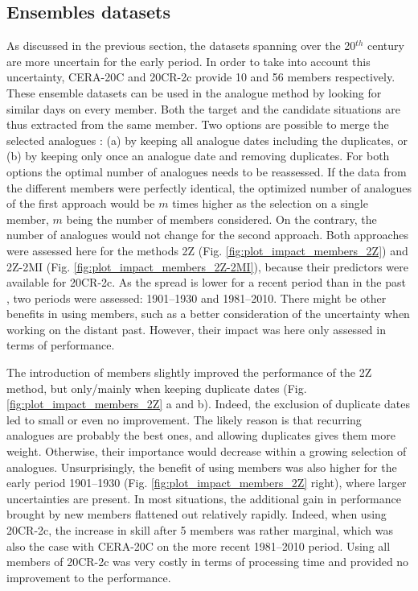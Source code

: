 \documentclass{ametsoc}
\begin{document}
\subsection{Ensembles datasets}
\label{sec:ensemble}

As discussed in the previous section, the datasets spanning over the 20$^{th}$ century are more uncertain for the early period. In order to take into account this uncertainty, CERA-20C and 20CR-2c provide 10 and 56 members respectively. These ensemble datasets can be used in the analogue method by looking for similar days on every member. Both the target and the candidate situations are thus extracted from the same member. Two options are possible to merge the selected analogues : (a) by keeping all analogue dates including the duplicates, or (b) by keeping only once an analogue date and removing duplicates. For both options the optimal number of analogues needs to be reassessed. If the data from the different members were perfectly identical, the optimized number of analogues of the first approach would be $m$ times higher as the selection on a single member, $m$ being the number of members considered. On the contrary, the number of analogues would not change for the second approach. Both approaches were assessed here for the methods 2Z (Fig. \ref{fig:plot_impact_members_2Z}) and 2Z-2MI (Fig. \ref{fig:plot_impact_members_2Z-2MI}), because their predictors were available for 20CR-2c. As the spread is lower for a recent period than in the past \citep{Compo2011}, two periods were assessed: 1901--1930 and 1981--2010. There might be other benefits in using members, such as a better consideration of the uncertainty when working on the distant past. However, their impact was here only assessed in terms of performance.

The introduction of members slightly improved the performance of the 2Z method, but only/mainly when keeping duplicate dates (Fig. \ref{fig:plot_impact_members_2Z} a and b). Indeed, the exclusion of duplicate dates led to small or even no improvement. The likely reason is that recurring analogues are probably the best ones, and allowing duplicates gives them more weight. Otherwise, their importance would decrease within a growing selection of analogues. Unsurprisingly, the benefit of using members was also higher for the early period 1901--1930 (Fig. \ref{fig:plot_impact_members_2Z} right), where larger uncertainties are present. In most situations, the additional gain in performance brought by new members flattened out relatively rapidly. Indeed, when using 20CR-2c, the increase in skill after 5 members was rather marginal, which was also the case with CERA-20C on the more recent 1981--2010 period. Using all members of 20CR-2c was very costly in terms of processing time and provided no improvement to the performance. 
\end{document}
